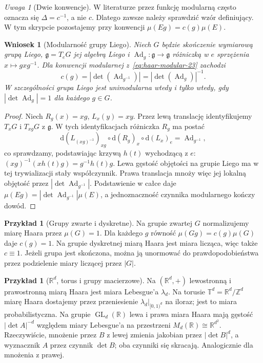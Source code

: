 \documentclass[11pt,a4paper,oneside]{book}
\numberwithin{equation}{chapter}
\theoremstyle{plain}
\newtheorem{wniosek}[twierdzenie]{Wniosek}
\theoremstyle{definition}
\newtheorem{przyklad}[twierdzenie]{Przykład}
\theoremstyle{remark}
\newtheorem{uwaga}[twierdzenie]{Uwaga}
\begin{document}
\begin{uwaga}[Dwie konwencje]
W literaturze przez funkcję modularną często oznacza
się $\Delta=c^{-1}$, a nie $c$. Dlatego zawsze
należy sprawdzić wzór definiujący. W tym skrypcie
pozostajemy przy konwencji
$\mu(Eg)=c(g)\mu(E)$.
\end{uwaga}

\begin{wniosek}[Modularność grupy Liego]
\label{cor:haar-adjoint-23}
Niech $G$ będzie skończenie wymiarową grupą Liego,
$\mathfrak g=T_eG$ jej algebrą Liego i
$\operatorname{Ad}_g:\mathfrak g\to\mathfrak g$
różniczką w $e$ sprzężenia $x\mapsto gxg^{-1}$.
Dla konwencji modularnej z~\eqref{eq:haar-modular-23}
zachodzi
\[
 c(g)=|\det(\operatorname{Ad}_{g^{-1}})|
       =|\det(\operatorname{Ad}_{g})|^{-1}.
\]
W szczególności grupa Liego jest unimodularna wtedy
i tylko wtedy, gdy $|\det\operatorname{Ad}_g|=1$
dla każdego $g\in G$.
\end{wniosek}
\begin{proof}
Niech $R_g(x)=xg$, $L_x(y)=xy$.
Przez lewą translację identyfikujemy $T_xG$ i
$T_{xg}G$ z $\mathfrak g$. W tych identyfikacjach
różniczka $R_g$ ma postać
\[
 \mathrm d(L_{(xg)^{-1}})_{xg}\circ
 \mathrm d(R_g)_x\circ\mathrm d(L_x)_e
 =\operatorname{Ad}_{g^{-1}},
\]
co sprawdzamy, podstawiając krzywą $h(t)$ wychodzącą
z $e$: $(xg)^{-1}(xh(t)g)=g^{-1}h(t)g$.
Lewa gęstość objętości na grupie Liego ma w tej
trywializacji stały współczynnik. Prawa translacja
mnoży więc jej lokalną objętość przez
$|\det\operatorname{Ad}_{g^{-1}}|$.
Podstawienie w całce daje
$\mu(Eg)=|\det\operatorname{Ad}_{g^{-1}}|\mu(E)$,
a jednoznaczność czynnika modularnego kończy dowód.
\end{proof}

\begin{przyklad}[Grupy zwarte i dyskretne]
\label{ex:haar-compact-discrete-23}
Na grupie zwartej $G$ normalizujemy miarę Haara
przez $\mu(G)=1$. Dla każdego $g$ równość
$\mu(Gg)=c(g)\mu(G)$ daje $c(g)=1$.
Na grupie dyskretnej miarą Haara jest miara licząca,
więc także $c\equiv1$. Jeżeli grupa jest skończona,
można ją unormować do prawdopodobieństwa przez
podzielenie miary liczącej przez $|G|$.
\end{przyklad}

\begin{przyklad}[$\mathbb R^d$, torus i grupy macierzowe]
\label{ex:haar-standard-23}
Na $(\mathbb R^d,+)$ lewostronną i prawostronną miarą
Haara jest miara Lebesgue'a $\lambda_d$.
Na torusie $\mathbb T^d=\mathbb R^d/\mathbb Z^d$
miarę Haara dostajemy przez przeniesienie
$\lambda_d|_{[0,1)^d}$ na iloraz; jest to miara
probabilistyczna. Na grupie
$\operatorname{GL}_d(\mathbb R)$ lewa i prawa miara Haara
mają gęstość $|\det A|^{-d}$ względem miary
Lebesgue'a na przestrzeni $M_d(\mathbb R)\cong\mathbb R^{d^2}$.
Rzeczywiście, mnożenie przez $B$ z lewej zmienia
jakobian przez $|\det B|^d$, a wyznacznik $A$
przez czynnik $\det B$; oba czynniki się skracają.
Analogicznie dla mnożenia z prawej.
\end{przyklad}
\end{document}
